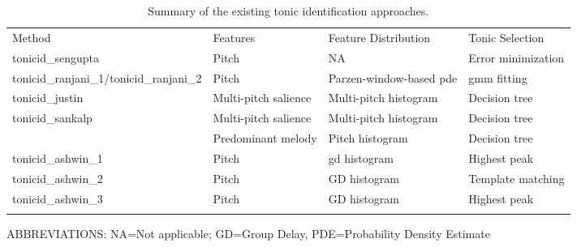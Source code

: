 \begin{table}
	\begin{threeparttable} 
		\begin{centering}
			\begin{tabular}{l L{4.5cm} L{4.5cm} L{3.5cm} }
				\tabletop			
				Method 	&	Features	&	Feature Distribution	&	Tonic Selection \\
				\tablemid			
				\acrshort{tonicid_sengupta} \citep{Sengupta2005b}	&	Pitch \citep{AKDatta_1996} & NA & Error minimization\\
				
				\acrshort{tonicid_ranjani_1}/\acrshort{tonicid_ranjani_2} \citep{ranjani2011carnatic}	&	Pitch \citep{BoersmaPaul2001} & Parzen-window-based \acrshort{pde} & \acrshort{gmm} fitting\\
				
				\acrshort{tonicid_justin} \citep{salamon2012multipitch} & Multi-pitch salience \citep{Salamon2011} & Multi-pitch histogram & Decision tree\\
				
				\acrshort{tonicid_sankalp} \citep{gulati2012two}	& Multi-pitch salience \citep{Salamon2011} & Multi-pitch histogram & Decision tree\\
				
				&	Predominant melody \citep{Salamon2012} & Pitch histogram & Decision tree\\
				
				\acrshort{tonicid_ashwin_1} \citep{bellur2012knowledge}	&	Pitch \citep{DeCheveigne2002}	& \acrshort{gd} histogram & Highest peak\\
				
				\acrshort{tonicid_ashwin_2} \citep{bellur2012knowledge}	&	Pitch \citep{DeCheveigne2002}	& 	GD histogram	&
				Template matching\\
				
				\acrshort{tonicid_ashwin_3} \citep{bellur2012knowledge}	&	Pitch \citep{DeCheveigne2002}	& 	GD histogram
				& Highest peak\\	
				
				\tablebot		
			\end{tabular}
			\par \end{centering}		
		\begin{tablenotes}
			\small
			\item[] ABBREVIATIONS: NA=Not applicable; GD=Group Delay, PDE=Probability Density Estimate
		\end{tablenotes}
			\caption[Summary of the existing tonic identification approaches.]{Summary of the existing tonic identification approaches.}
			\label{tab:pre_processing_tonic_identification_summary_methods}
	\end{threeparttable}
\end{table}

